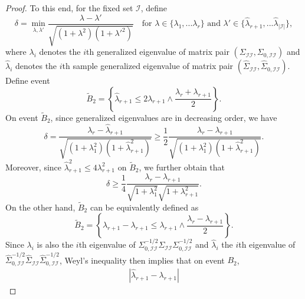 \documentclass[11pt]{article}
\newcommand{\nb}[1]{\textcolor{orange}{\texttt{[#1]}}}
\newcommand{\cI}{{\mathcal{I}}}
\newcommand{\0}{{\mathbf{0}}}
\begin{document}
\begin{proof}
To this end,  for the fixed set $\cI$, define
\begin{equation*}
\delta = \min_{\lambda,\lambda'}{\frac{\lambda-\lambda'}{\sqrt{(1+\lambda^2)(1+\lambda'^2)}}}\quad\text{for $\lambda\in\{\lambda_1,...\lambda_r\}$ and $\lambda'\in\{\widehat{\lambda}_{r+1},...\widehat{\lambda}_{|\cI|}\}$},
\end{equation*}
where $\lambda_i$ denotes the $i$th generalized eigenvalue of matrix pair $(\Sigma_{\cI\cI}, \Sigma_{0,\cI\cI})$ and $\widehat{\lambda}_i$ denotes the $i$th sample generalized eigenvalue of matrix pair $(\widehat{\Sigma}_{\cI\cI},\widehat{\Sigma}_{0,\cI\cI})$. 
Define event 
\begin{equation*}
 \widetilde{B}_2 = 
\left\{\widehat{\lambda}_{r+1}\leq 2\lambda_{r+1}\wedge\frac{\lambda_r+\lambda_{r+1}}{2}  
\right\}.
\end{equation*}
On event $\widetilde{B}_2$,
since generalized eigenvalues are in decreasing order, 
we have 
\begin{equation*}
      \delta=\frac{\lambda_r-\widehat{\lambda}_{r+1}}{\sqrt{(1+\lambda_1^2)(1+\widehat{\lambda}_{r+1}^2)}}\geq \frac{1}{2}\frac{\lambda_r-\lambda_{r+1}}{\sqrt{(1+\lambda_1^2)(1+\widehat{\lambda}_{r+1}^2)}}.
\end{equation*}
Moreover, since  $\widehat{\lambda}_{r+1}^2\leq {4\lambda_{r+1}^2}$ on $\widetilde{B}_2$,
we further obtain that 
\begin{equation*}
\delta\geq \frac{1}{4}\frac{\lambda_r-\lambda_{r+1}}{\sqrt{1+\lambda_1^2}\sqrt{{1+\lambda_{r+1}^2}}}.
\end{equation*}
On the other hand,  $\widetilde{B}_2$ can be equivalently defined as
\begin{equation*}
\widetilde{B}_2
= \left\{\widehat{\lambda}_{r+1}-\lambda_{r+1}\leq \lambda_{r+1}\wedge\frac{\lambda_r-\lambda_{r+1}}{2}  \right\}.
\end{equation*} 
Since $\lambda_i$ is also the $i$th eigenvalue of $\Sigma_{0,\cI\cI}^{-1/2}\Sigma_{\cI\cI}\Sigma_{0,\cI\cI}^{-1/2}$ and $\widehat\lambda_i$ the $i$th eigenvalue of $\widehat\Sigma_{0,\cI\cI}^{-1/2}\widehat\Sigma_{\cI\cI} \widehat\Sigma_{0,\cI\cI}^{-1/2}$,
Weyl's inequality then implies that on event $B_2$,
\begin{align*}
|\widehat{\lambda}_{r+1}-\lambda_{r+1}|

\end{align*}
\end{proof}
\end{document}
